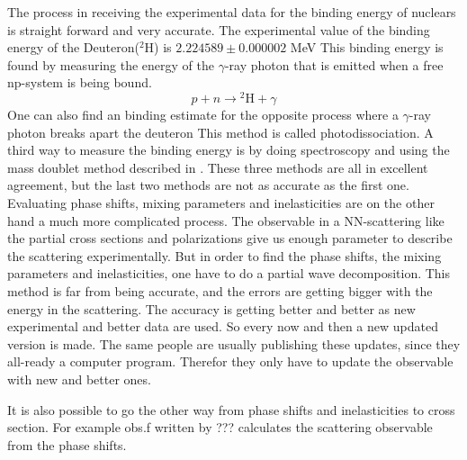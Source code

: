 \label{chap:Experimental data}


The process in receiving the experimental data for the binding energy of nuclears
is straight forward and very accurate.
The experimental value of the binding energy of the Deuteron(${}^2$H) is $2.224589\pm0.000002$  MeV
This binding energy is found by measuring the energy of the $\gamma$-ray photon that is emitted when a free np-system is 
being bound.
\begin{equation}
p+n\rightarrow {}^2{\text{H}}+\gamma
\end{equation}
One can also find an binding estimate for the opposite process where a $\gamma$-ray photon breaks apart the deuteron
This method is called photodissociation. A third way to measure the binding energy is by doing spectroscopy and using the
mass doublet method described in \cite{roed}. 
These three methods are all in excellent agreement, but the last two methods are not as accurate as the first one.
\nl
Evaluating phase shifts, mixing parameters and inelasticities are on the other hand a much more complicated process.
The observable in a NN-scattering like the partial cross sections and polarizations give us enough
parameter to describe the scattering experimentally. But in order to find the phase shifts, the mixing parameters  and
inelasticities, one have to 
do a partial wave decomposition. This method is far from being accurate, and the errors are getting bigger with
the energy in the scattering. The accuracy is getting better and better as new experimental and better data
are used. So every now and then a new updated version is made. The
same people are usually publishing these updates, since they all-ready a computer program. Therefor they only 
have to update the observable with new and better ones.

It is also possible to go the other way from phase shifts and inelasticities to cross section. For example
obs.f written by ??? calculates the scattering observable from the phase shifts.

